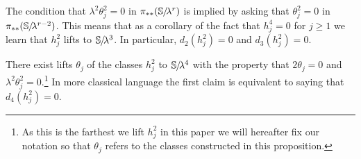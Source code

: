 \begin{rmk} \label{rmk:theta-ctau-3}
  The condition that $\lambda^2\theta_{j}^2 = 0$ in $\pi_{**}(\operatorname{\mathbb{S}}\hspace{-2.2pt}/\!\lambda^r)$ is implied by asking that $\theta_j^2 =0$ in $\pi_{**}(\operatorname{\mathbb{S}}\hspace{-2.2pt}/\!\lambda^{r-2})$. This means that as a corollary of the fact that $h_j^4 = 0$ for $j \geq 1$ we learn that $h_j^2$ lifts to $\operatorname{\mathbb{S}}\hspace{-2.2pt}/\!\lambda^3$. In particular, $d_2(h_j^2) = 0$ and $d_3(h_j^2) = 0$.
\end{rmk}

\begin{prop} \label{cor:theta-ctau-4}
  There exist lifts $\theta_j$ of the classes $h_j^2$ to $\operatorname{\mathbb{S}}\hspace{-2.2pt}/\!\lambda^4$ with the property that $2\theta_j = 0$ and $\lambda^2 \theta_j^2 = 0$.\footnote{As this is the farthest we lift $h_j^2$ in this paper we will hereafter fix our notation so that $\theta_j$ refers to the classes constructed in this proposition.} In more classical language the first claim is equivalent to saying that $d_4(h_j^2) = 0 $.
\end{prop}

